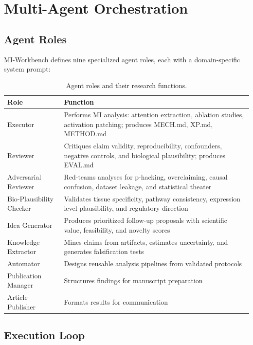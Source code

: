 \documentclass[11pt,a4paper]{article}
\begin{document}

\section{Multi-Agent Orchestration}
\label{sec:orchestration}

\subsection{Agent Roles}

MI-Workbench defines nine specialized agent roles, each with a domain-specific system prompt:

\begin{table}[h]
\centering
\small
\caption{Agent roles and their research functions.}
\label{tab:roles}
\begin{tabular}{@{}lp{8cm}@{}}
\toprule
\textbf{Role} & \textbf{Function} \\
\midrule
Executor & Performs MI analysis: attention extraction, ablation studies, activation patching; produces MECH.md, XP.md, METHOD.md \\
Reviewer & Critiques claim validity, reproducibility, confounders, negative controls, and biological plausibility; produces EVAL.md \\
Adversarial Reviewer & Red-teams analyses for p-hacking, overclaiming, causal confusion, dataset leakage, and statistical theater \\
Bio-Plausibility Checker & Validates tissue specificity, pathway consistency, expression level plausibility, and regulatory direction \\
Idea Generator & Produces prioritized follow-up proposals with scientific value, feasibility, and novelty scores \\
Knowledge Extractor & Mines claims from artifacts, estimates uncertainty, and generates falsification tests \\
Automator & Designs reusable analysis pipelines from validated protocols \\
Publication Manager & Structures findings for manuscript preparation \\
Article Publisher & Formats results for communication \\
\bottomrule
\end{tabular}
\end{table}

\subsection{Execution Loop}
\label{sec:loop}
\end{document}

